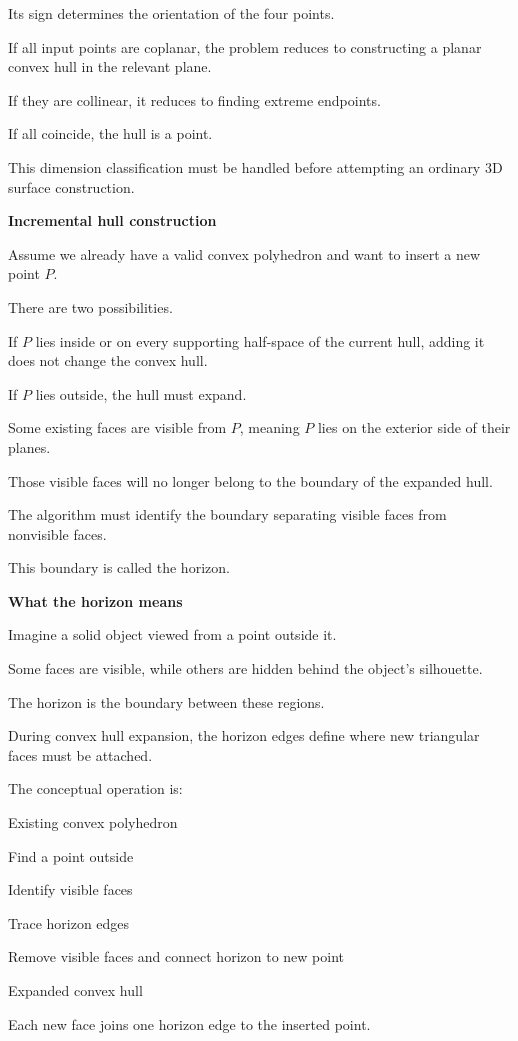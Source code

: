Its sign determines the orientation of the four points.

If all input points are coplanar, the problem reduces to constructing a planar convex hull in the relevant plane.

If they are collinear, it reduces to finding extreme endpoints.

If all coincide, the hull is a point.

This dimension classification must be handled before attempting an ordinary 3D surface construction.

\textbf{Incremental hull construction}

Assume we already have a valid convex polyhedron and want to insert a new point \(P\).

There are two possibilities.

If \(P\) lies inside or on every supporting half-space of the current hull, adding it does not change the convex hull.

If \(P\) lies outside, the hull must expand.

Some existing faces are visible from \(P\), meaning \(P\) lies on the exterior side of their planes.

Those visible faces will no longer belong to the boundary of the expanded hull.

The algorithm must identify the boundary separating visible faces from nonvisible faces.

This boundary is called the horizon.

\textbf{What the horizon means}

Imagine a solid object viewed from a point outside it.

Some faces are visible, while others are hidden behind the object's silhouette.

The horizon is the boundary between these regions.

During convex hull expansion, the horizon edges define where new triangular faces must be attached.

The conceptual operation is:

Existing convex polyhedron

Find a point outside

Identify visible faces

Trace horizon edges

Remove visible faces and connect horizon to new point

Expanded convex hull

Each new face joins one horizon edge to the inserted point.

